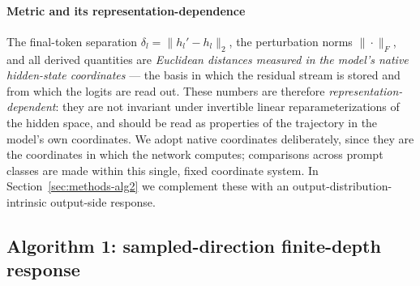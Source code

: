 \documentclass{article}
\begin{document}
\paragraph{Metric and its representation-dependence}
The final-token separation $\delta_l=\|h_l'-h_l\|_2$, the perturbation norms $\|\cdot\|_F$, and
all derived quantities are \emph{Euclidean distances measured in the model's native hidden-state
coordinates} --- the basis in which the residual stream is stored and from which the logits are
read out. These numbers are therefore \emph{representation-dependent}: they are not invariant
under invertible linear reparameterizations of the hidden space, and should be read as
properties of the trajectory in the model's own coordinates. We adopt native coordinates
deliberately, since they are the coordinates in which the network computes; comparisons across
prompt classes are made within this single, fixed coordinate system. In
Section~\ref{sec:methods-alg2} we complement these with an output-distribution-intrinsic output-side response.

\subsection{Algorithm 1: sampled-direction finite-depth response}
\label{sec:methods-alg1}
\end{document}
